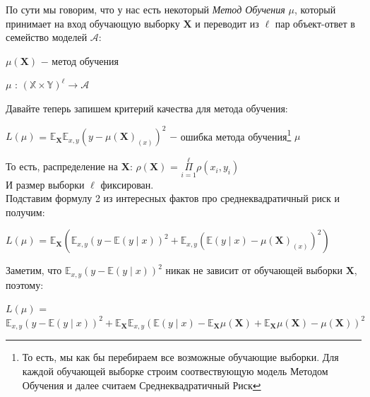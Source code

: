             \begin{center}
            \end{center}

            По сути мы говорим, что у нас есть некоторый \textit{Метод Обучения} $\mu$, который принимает на вход обучающую выборку $\mathbf{X}$ и переводит из $\ell$ пар объект-ответ в семейство моделей $\mathcal{A}$:
            \begin{center}
                $\mu(\mathbf{X})$ $-$ метод обучения
            \end{center}
            \begin{center}
                $\mu$ : $(\mathbb{X} \times \mathbb{Y})^\ell \longrightarrow \mathcal{A}$
            \end{center}

            Давайте теперь запишем критерий качества для метода обучения:
            \begin{center}
                $L(\mu)$ = $\mathbb{E}_{\mathbf{X}}\mathbb{E}_{x, y} (y - \mu(\mathbf{X})_{(x)})^2$ $-$ ошибка метода обучения\footnote{То есть, мы как бы перебираем все возможные обучающие выборки. Для каждой обучающей выборке строим соотвествующую модель Методом Обучения и далее считаем Среднеквадратичный Риск } $\mu$ 
            \end{center}

            То есть, распределение на $\mathbf{X}$: $\rho(\mathbf{X})$ = $\Pi\limits_{i = 1}^\ell \rho(x_i, y_i)$\\

            И размер выборки $\ell$ фиксирован.\\

            Подставим формулу 2 из интересных фактов про среднеквадратичный риск и получим:
            \begin{center}
            \large
                $L(\mu)$ = $\mathbb{E}_{\mathbf{X}}(\mathbb{E}_{x, y}(y - \mathbb{E}(y \mid x))^2 + \mathbb{E}_{x, y}(\mathbb{E}(y \mid x) - \mu(\mathbf{X})_{(x)})^2)$
            \end{center}

            Заметим, что $\mathbb{E}_{x, y}(y - \mathbb{E}(y \mid x))^2$ никак не зависит от обучающей выборки $\mathbf{X}$, поэтому:
            \begin{center}
                $L(\mu)$ = $\mathbb{E}_{x, y}(y - \mathbb{E}(y \mid x))^2 + \mathbb{E}_{\mathbf{X}} \mathbb{E}_{x, y} (\mathbb{E}(y \mid x) - \mathbb{E}_{\mathbf{X}}\mu(\mathbf{X}) + \mathbb{E}_{\mathbf{X}}\mu(\mathbf{X}) - \mu(\mathbf{X}))^2$
            \end{center}

